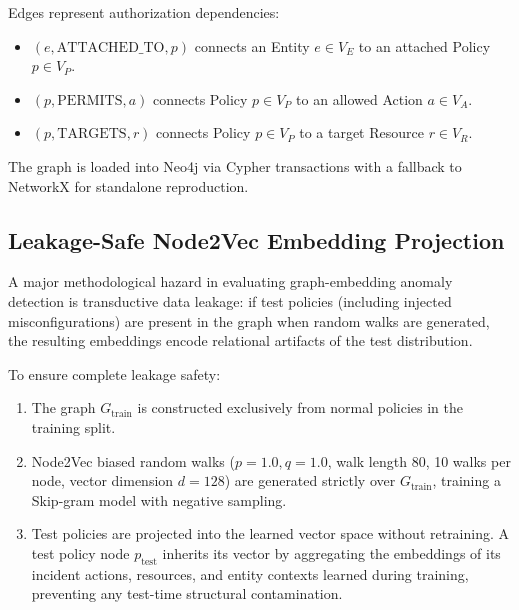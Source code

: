Edges represent authorization dependencies:
\begin{itemize}
    \item $(e, \text{ATTACHED\_TO}, p)$ connects an Entity $e \in V_E$ to an attached Policy $p \in V_P$.
    \item $(p, \text{PERMITS}, a)$ connects Policy $p \in V_P$ to an allowed Action $a \in V_A$.
    \item $(p, \text{TARGETS}, r)$ connects Policy $p \in V_P$ to a target Resource $r \in V_R$.
\end{itemize}
The graph is loaded into Neo4j via Cypher transactions with a fallback to NetworkX for standalone reproduction.

\subsection{Leakage-Safe Node2Vec Embedding Projection}
A major methodological hazard in evaluating graph-embedding anomaly detection is transductive data leakage: if test policies (including injected misconfigurations) are present in the graph when random walks are generated, the resulting embeddings encode relational artifacts of the test distribution. 

To ensure complete leakage safety:
\begin{enumerate}
    \item The graph $G_{\text{train}}$ is constructed exclusively from normal policies in the training split.
    \item Node2Vec biased random walks ($p=1.0, q=1.0$, walk length 80, 10 walks per node, vector dimension $d=128$) are generated strictly over $G_{\text{train}}$, training a Skip-gram model with negative sampling.
    \item Test policies are projected into the learned vector space without retraining. A test policy node $p_{\text{test}}$ inherits its vector by aggregating the embeddings of its incident actions, resources, and entity contexts learned during training, preventing any test-time structural contamination.
\end{enumerate}


